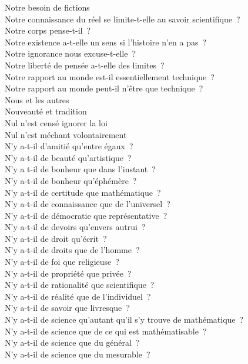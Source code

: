 \documentclass[a4paper,12pt]{article}
\begin{document}
Notre besoin de fictions \\
Notre connaissance du réel se limite-t-elle au savoir scientifique ? \\
Notre corps pense-t-il ? \\
Notre existence a-t-elle un sens si l'histoire n'en a pas ? \\
Notre ignorance nous excuse-t-elle ? \\
Notre liberté de pensée a-t-elle des limites ? \\
Notre rapport au monde est-il essentiellement technique ? \\
Notre rapport au monde peut-il n'être que technique ? \\
Nous et les autres \\
Nouveauté et tradition \\
Nul n'est censé ignorer la loi \\
Nul n'est méchant volontairement \\
N'y a-t-il d'amitié qu'entre égaux ? \\
N'y a-t-il de beauté qu'artistique ? \\
N'y a t-il de bonheur que dans l'instant ? \\
N'y a-t-il de bonheur qu'éphémère ? \\
N'y a-t-il de certitude que mathématique ? \\
N'y a-t-il de connaissance que de l'universel ? \\
N'y a-t-il de démocratie que représentative ? \\
N'y a-t-il de devoirs qu'envers autrui ? \\
N'y a-t-il de droit qu'écrit ? \\
N'y a-t-il de droits que de l'homme ? \\
N'y a-t-il de foi que religieuse ? \\
N'y a-t-il de propriété que privée ? \\
N'y a-t-il de rationalité que scientifique ? \\
N'y a-t-il de réalité que de l'individuel ? \\
N'y a-t-il de savoir que livresque ? \\
N'y a-t-il de science qu'autant qu'il s'y trouve de mathématique ? \\
N'y a-t-il de science que de ce qui est mathématisable ? \\
N'y a-t-il de science que du général ? \\
N'y a-t-il de science que du mesurable ? \\
\end{document}
